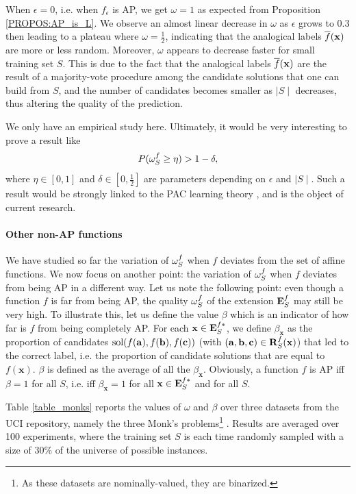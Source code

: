 When $\epsilon = 0$, i.e. when $f_\epsilon$ is AP, we get $\omega = 1$ as expected from
Proposition \ref{PROPOS:AP_is_L}. We observe an almost linear decrease in $\omega$ as
$\epsilon$ grows to $0.3$ then leading to a plateau where $\omega =
\frac{1}{2}$, indicating that the analogical labels $\overline{f}(\mathbf{x})$ are
more or less random. Moreover, $\omega$ appears to decrease faster for small
training set $S$. This is due to the fact that the analogical labels
$\overline{f}(\mathbf{x})$ are the result of a majority-vote procedure among the
candidate solutions that one can build from $S$, and the number of candidates
becomes smaller as $\mid S\mid$ decreases, thus altering the quality of the
prediction.

We only have an empirical study here. Ultimately, it would be very interesting
to prove a result like
$$P(\omega_{S}^{f} \geq \eta) > 1 - \delta,$$
where $\eta \in [0, 1]$ and $\delta \in [0, \frac{1}{2}]$ are parameters 
depending on $\epsilon$ and $\mid S \mid$. Such a result would be strongly
linked to the PAC learning theory \cite{Val72}, and is the object of current
research.

\paragraph{Other non-AP functions\\}


We have studied so far the variation of $\omega_{S}^{f}$ when $f$ deviates from
the set of affine functions. We now focus on another point: the variation of
$\omega_{S}^{f}$ when $f$ deviates from being AP in a different way.
Let us note the following point: even though a function $f$ is far from being
AP, the quality $\omega_{S}^{f}$ of the extension $\mathbf{E}_{S}^{f}$ may still be very
high. To illustrate this, let us define the value $\beta$ which is an indicator
of how far is $f$ from being completely AP.  For each $\mathbf{x} \in
\mathbf{E}_{S}^{f*}$, we define $\beta_\mathbf{x}$ as the proportion of
candidates $\text{sol}(f(\mathbf{a}), f(\mathbf{b}), f(\mathbf{c}))$ (with
$(\mathbf{a}, \mathbf{b}, \mathbf{c}) \in \mathbf{R}_{S}^{f}(\mathbf{x})$) that led to the correct
label, i.e. the proportion of candidate solutions that are equal to
$f(\mathbf{x})$. $\beta$ is defined as the average of all the
$\beta_\mathbf{x}$.  Obviously, a function $f$ is AP iff $\beta = 1$ for all
$S$, i.e. iff $\beta_\mathbf{x} = 1$ for all $\mathbf{x} \in \mathbf{E}_{S}^{f*}$
and for all $S$.

Table \ref{table_monks} reports the values of $\omega$ and $\beta$ over three
datasets from the UCI repository, namely the three Monk's problems\footnote{As
these datasets are nominally-valued, they are binarized.} \cite{UCIrepo}.
Results are averaged over 100 experiments, where the training set $S$ is each
time randomly sampled with a size of $30$\% of the universe of possible
instances.

